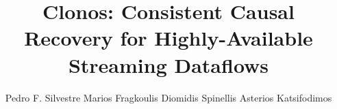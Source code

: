\documentclass[sigconf]{acmart}
\begin{document}
\fancyhead{}

\title{Clonos: Consistent Causal Recovery for Highly-Available Streaming Dataflows}

\author{Pedro F. Silvestre \hfill Marios Fragkoulis \hfill Diomidis Spinellis \hfill Asterios Katsifodimos}
\vspace{3mm}




\renewcommand{\shortauthors}{Pedro F. Silvestre, Marios Fragkoulis, Diomidis Spinellis and Asterios Katsifodimos}


\newcommand{\revision}[1]{{\color{blue}#1}}


\end{document}
